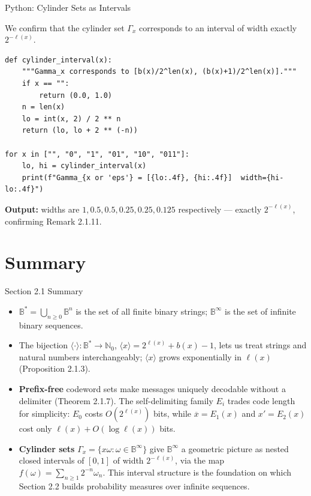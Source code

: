\documentclass[aspectratio=169,10pt]{beamer}
\newcommand{\Bs}{\mathbb{B}^{*}}
\newcommand{\Binf}{\mathbb{B}^{\infty}}
\newcommand{\Bb}{\mathbb{B}}
\newcommand{\len}{\ell}
\newcommand{\bij}[1]{\langle #1\rangle}
\begin{document}
\begin{frame}[fragile]{Python: Cylinder Sets as Intervals}

We confirm that the cylinder set $\Gamma_x$ corresponds to an interval of
width exactly $2^{-\len(x)}$.

\begin{lstlisting}
def cylinder_interval(x):
    """Gamma_x corresponds to [b(x)/2^len(x), (b(x)+1)/2^len(x)]."""
    if x == "":
        return (0.0, 1.0)
    n = len(x)
    lo = int(x, 2) / 2 ** n
    return (lo, lo + 2 ** (-n))

for x in ["", "0", "1", "01", "10", "011"]:
    lo, hi = cylinder_interval(x)
    print(f"Gamma_{x or 'eps'} = [{lo:.4f}, {hi:.4f}]  width={hi-lo:.4f}")
\end{lstlisting}

\textbf{Output:} widths are $1, 0.5, 0.5, 0.25, 0.25, 0.125$ respectively
--- exactly $2^{-\len(x)}$, confirming Remark 2.1.11.
\end{frame}

\section{Summary}

\begin{frame}{Section 2.1 Summary}
\begin{itemize}
  \item $\Bs=\bigcup_{n\geq0}\Bb^n$ is the set of all finite binary
    strings; $\Binf$ is the set of infinite binary sequences.
  \item The bijection $\bij{\cdot}:\Bs\to\mathbb{N}_0$,
    $\bij{x}=2^{\len(x)}+b(x)-1$, lets us treat strings and natural numbers
    interchangeably; $\bij{x}$ grows exponentially in $\len(x)$
    (Proposition 2.1.3).
  \item \textbf{Prefix-free} codeword sets make messages uniquely
    decodable without a delimiter (Theorem 2.1.7). The self-delimiting
    family $E_i$ trades code length for simplicity: $E_0$ costs
    $O(2^{\len(x)})$ bits, while $\overline{x}=E_1(x)$ and $x'=E_2(x)$ cost
    only $\len(x)+O(\log\len(x))$ bits.
  \item \textbf{Cylinder sets} $\Gamma_x=\{x\omega:\omega\in\Binf\}$ give
    $\Binf$ a geometric picture as nested closed intervals of $[0,1]$ of
    width $2^{-\len(x)}$, via the map
    $f(\omega)=\sum_{n\geq1}2^{-n}\omega_n$. This interval structure is the
    foundation on which Section 2.2 builds probability measures over
    infinite sequences.
\end{itemize}
\end{frame}
\end{document}
